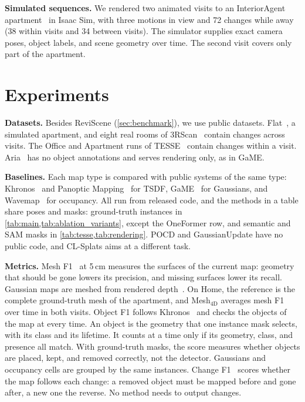 \documentclass[10pt,twocolumn,letterpaper]{article}
\begin{document}
\noindent\textbf{Simulated sequences.}
We rendered two animated visits to an InteriorAgent apartment~\cite{InteriorAgent2025} in Isaac Sim, with three motions in view and 72 changes while away (38 within visits and 34 between visits). The simulator supplies exact camera poses, object labels, and scene geometry over
time. The second visit covers only part of the apartment.



\section{Experiments}
\label{sec:experiments}

\noindent\textbf{Datasets.}
Besides ReviScene (\cref{sec:benchmark}), we use public datasets. Flat~\cite{9811877}, a simulated apartment, and eight real rooms of 3RScan~\cite{9010673} contain changes across visits. The Office and Apartment runs of TESSE~\cite{Schmid-RSS-24} contain changes within a visit. Aria~\cite{Yugay_2026_CVPR} has no object annotations and serves rendering only, as in GaME.

\noindent\textbf{Baselines.}
Each map type is compared with public systems of the same type: Khronos~\cite{Schmid-RSS-24} and Panoptic Mapping~\cite{9811877} for TSDF, GaME~\cite{Yugay_2026_CVPR} for Gaussians, and Wavemap~\cite{Reijgwart-RSS-23} for occupancy. All run from released code, and the methods in a table share poses and masks: ground-truth instances in \cref{tab:main,tab:ablation_variants}, except the OneFormer row, and semantic and SAM masks in \cref{tab:tesse,tab:rendering}. POCD and GaussianUpdate have no public code, and CL-Splats aims at a different task.

\noindent\textbf{Metrics.}
Mesh F1~\cite{Knapitsch2017} at 5\,cm measures the surfaces of the current map: geometry that should be gone lowers its precision, and missing surfaces lower its recall. Gaussian maps are meshed from rendered depth~\cite{Huang2DGS2024}. On Home, the reference is the complete ground-truth mesh of the apartment, and Mesh$_{\mathrm{4D}}$ averages mesh F1 over time in both visits. Object F1 follows Khronos~\cite{Schmid-RSS-24} and checks the objects of the map at every time. An object is the geometry that one instance mask selects, with its class and its lifetime. It counts at a time only if its geometry, class, and presence all match. With ground-truth masks, the score measures whether objects are placed, kept, and removed correctly, not the detector. Gaussians and occupancy cells are grouped by the same instances. Change F1~\cite{Schmid-RSS-24} scores whether the map follows each change: a removed object must be mapped before and gone after, a new one the reverse. No method needs to output changes.
\end{document}
